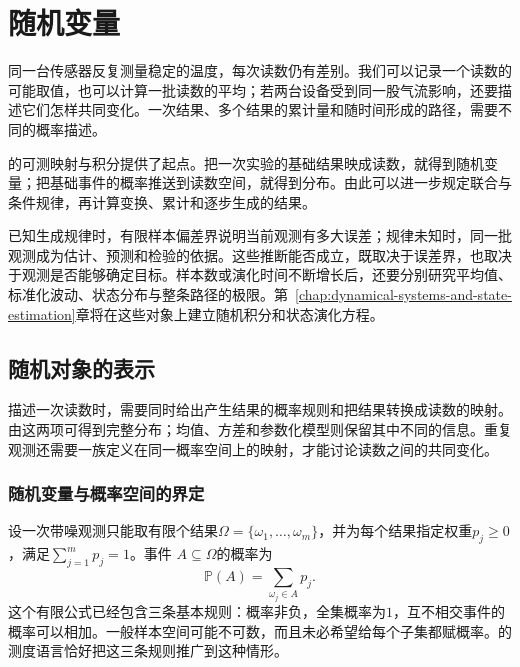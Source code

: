 \chapter{随机变量}
\label{chap:random-variables}
\label{chap:probability-theory}
\label{chap:stochastic-processes-and-approximation}
\label{chap:mathematical-statistics}

同一台传感器反复测量稳定的温度，每次读数仍有差别。我们可以记录一个读数的可能取值，也可以计算一批读数的平均；若两台设备受到同一股气流影响，还要描述它们怎样共同变化。一次结果、多个结果的累计量和随时间形成的路径，需要不同的概率描述。

的可测映射与积分提供了起点。把一次实验的基础结果映成读数，就得到随机变量；把基础事件的概率推送到读数空间，就得到分布。由此可以进一步规定联合与条件规律，再计算变换、累计和逐步生成的结果。

已知生成规律时，有限样本偏差界说明当前观测有多大误差；规律未知时，同一批观测成为估计、预测和检验的依据。这些推断能否成立，既取决于误差界，也取决于观测是否能够确定目标。样本数或演化时间不断增长后，还要分别研究平均值、标准化波动、状态分布与整条路径的极限。第~\ref{chap:dynamical-systems-and-state-estimation}章将在这些对象上建立随机积分和状态演化方程。

\section{随机对象的表示}
\label{sec:rv-definition}
\label{sec:probability-representation-conditioning}
描述一次读数时，需要同时给出产生结果的概率规则和把结果转换成读数的映射。由这两项可得到完整分布；均值、方差和参数化模型则保留其中不同的信息。重复观测还需要一族定义在同一概率空间上的映射，才能讨论读数之间的共同变化。

\subsection{随机变量与概率空间的界定}
\label{sec:probability-spaces-random-variables}
设一次带噪观测只能取有限个结果\(\Omega=\{\omega_1,\ldots,\omega_m\}\)，并为每个结果指定权重\(p_j\geq0\)，满足\(\sum_{j=1}^{m}p_j=1\)。事件
\(A\subseteq\Omega\)的概率为
\[ \mathbb{P}(A)=\sum_{\omega_j\in A}p_j. \]
这个有限公式已经包含三条基本规则：概率非负，全集概率为\(1\)，互不相交事件的概率可以相加。一般样本空间可能不可数，而且未必希望给每个子集都赋概率。的测度语言恰好把这三条规则推广到这种情形。

